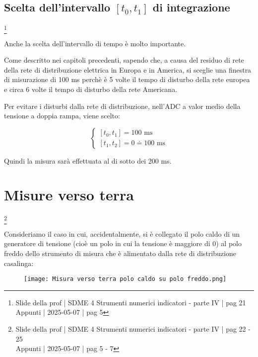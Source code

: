 \newpage

\subsection{Scelta dell'intervallo $[t_0, t_1]$ di integrazione}
\footnote{Slide della prof | SDME 4 Strumenti numerici indicatori - parte IV | pag 21\\  
Appunti | 2025-05-07 | pag 5}

Anche la scelta dell'intervallo di tempo è molto importante. \newline 

Come descritto nei capitoli precedenti, sapendo che, a causa del residuo di rete della rete di distribuzione elettrica in Europa e in America, 
si sceglie una finestra di misurazione di 100 ms perchè è 5 volte il tempo di disturbo della rete europea e circa 6 volte il tempo di disturbo della rete Americana. \newline 

Per evitare i disturbi dalla rete di distribuzione, nell'ADC a valor medio della tensione a doppia rampa, viene scelto: 

{
    \Large 
    \begin{equation}
        \begin{cases}
        [t_0, t_1] = 100 \text{ ms}
        \\
        [t_1, t_2] = 0 \doteq 100 \text{ ms}
        \end{cases}
    \end{equation}
}


Quindi la misura sarà effettuata al di sotto dei 200 ms. \newline 

\newpage 

\section{Misure verso terra}
\footnote{Slide della prof | SDME 4 Strumenti numerici indicatori - parte IV | pag 22 - 25\\  
Appunti | 2025-05-07 | pag 5 - 7}

Consideriamo il caso in cui, accidentalmente, si è collegato il polo caldo di un generatore di tensione (cioè un polo in cui la tensione è maggiore di 0) 
al polo freddo dello strumento di misura che è alimentato dalla rete di distribuzione casalinga: 

\begin{figure}[h]
    \centering
    \texttt{[image: Misura verso terra polo caldo su polo freddo.png]}
\end{figure}

